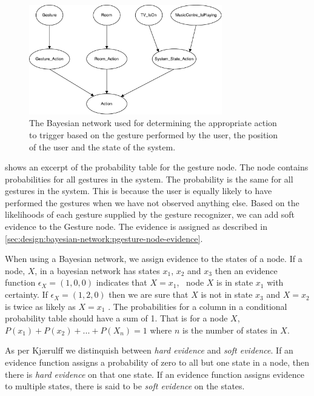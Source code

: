 \begin{figure}[h!]
\centering
\includegraphics[width=0.75\textwidth]{images/bayesian-network}
\caption{The Bayesian network used for determining the appropriate action to trigger based on the gesture performed by the user, the position of the user and the state of the system.}
\label{fig:design:bayesian-network:overview}
\end{figure}

 shows an excerpt of the probability table for the gesture node. The node contains probabilities for all gestures in the system. The probability is the same for all gestures in the system. This is because the user is equally likely to have performed the gestures when we have not observed anything else. Based on the likelihoods of each gesture supplied by the gesture recognizer, we can add soft evidence to the Gesture node. The evidence is assigned as described in \cref{sec:design:bayesian-network:pgesture-node-evidence}.

When using a Bayesian network, we assign evidence to the states of a node. If a node, $X$, in a bayesian network has states $x_1$, $x_2$ and $x_3$ then an evidence function $\epsilon_X = (1, 0, 0)$ indicates that $X = x_1$, \ie~node $X$ is in state $x_1$ with certainty. If $\epsilon_X = (1, 2, 0)$ then we are sure that $X$ is not in state $x_3$ and $X = x_2$ is twice as likely as $X = x_1$ \cite[pp. 23-24]{kjaerulff2008bayesian}. The probabilities for a column in a conditional probability table should have a sum of 1. That is for a node $X$, $P(x_1) + P(x_2) + ... + P(X_n) = 1$ where $n$ is the number of states in $X$.

As per Kjærulff \etal\cite[pp. 23-24]{kjaerulff2008bayesian} we distinquish between \emph{hard evidence} and \emph{soft evidence}. If an evidence function assigns a probability of zero to all but one state in a node, then there is \emph{hard evidence} on that one state. If an evidence function assigns evidence to multiple states, there is said to be \emph{soft evidence} on the states.

